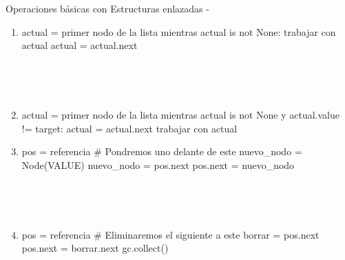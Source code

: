 \documentclass[10pt,envcountsect,spanish]{beamer}
\begin{document}
\begin{frame}{Operaciones básicas con Estructuras enlazadas -}

\begin{enumerate}
\item {} 

\begin{pyverbatim}
actual = primer nodo de la lista
mientras actual is not None:
  trabajar con actual
  actual = actual.next
\end{pyverbatim}

\

\


\item {}

\begin{pyverbatim}
actual = primer nodo de la lista
mientras actual is not None y actual.value != target:
  actual = actual.next
trabajar con actual
\end{pyverbatim}

\framebreak 

\item {} 

\begin{pyverbatim}
pos = referencia # Pondremos uno delante de este
nuevo_nodo = Node(VALUE)
nuevo_nodo = pos.next
pos.next = nuevo_nodo
\end{pyverbatim}

\

\

\item {} 

\begin{pyverbatim}
pos = referencia # Eliminaremos el siguiente a este
borrar = pos.next
pos.next = borrar.next
gc.collect()
\end{pyverbatim}

\end{enumerate}

\end{frame}
\end{document}

